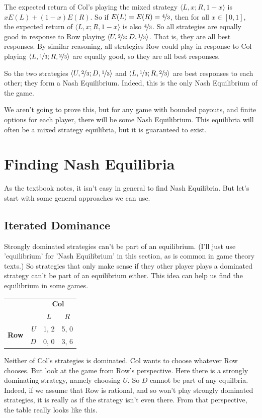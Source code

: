 \documentclass[openany]{book}
\begin{document}
The expected return of Col's playing the mixed strategy $\langle L, x; R, 1-x \rangle$ is $xE(L) + (1-x)E(R)$. So if $E(L) = E(R) = \nicefrac{4}{3}$, then for all $x \in [0, 1]$, the expected return of $\langle L, x; R, 1-x \rangle$ is also $\nicefrac{4}{3}$. So all strategies are equally good in response to Row playing $\langle U, \nicefrac{2}{3}; D, \nicefrac{1}{3} \rangle$. That is, they are all best responses. By similar reasoning, all strategies Row could play in response to Col playing $\langle L, \nicefrac{1}{3}; R, \nicefrac{2}{3} \rangle$ are equally good, so they are all best responses.

So the two strategies $\langle U, \nicefrac{2}{3}; D, \nicefrac{1}{3} \rangle$ and $\langle L, \nicefrac{1}{3}; R, \nicefrac{2}{3} \rangle$ are best responses to each other; they form a Nash Equilibrium. Indeed, this is the only Nash Equilibrium of the game.

We aren't going to prove this, but for any game with bounded payouts, and finite options for each player, there will be some Nash Equilibrium. This equilibria will often be a mixed strategy equilibria, but it is guaranteed to exist.

\section{Finding Nash Equilibria}

As the textbook notes, it isn't easy in general to find Nash Equilibria. But let's start with some general approaches we can use. 

\subsection{Iterated Dominance}

Strongly dominated strategies can't be part of an equilibrium. (I'll just use 'equilibrium' for 'Nash Equilibrium' in this section, as is common in game theory texts.) So strategies that only make sense if they other player plays a dominated strategy can't be part of an equilibrium either. This idea can help us find the equilibrium in some games.

\begin{center}
\begin{tabular}{l r | c c}
& & \multicolumn{2}{c}{\textbf{Col}} \\
& & $L$ & $R$ \\ \hline
\multirow{2}{*}{\textbf{Row}} & $U$ & 1, 2 & 5, 0\\
& $D$ & 0, 0 & 3, 6
\end{tabular}
\end{center}
Neither of Col's strategies is dominated. Col wants to choose whatever Row chooses. But look at the game from Row's perspective. Here there is a strongly dominating strategy, namely choosing $U$. So $D$ cannot be part of any equilbria. Indeed, if we assume that Row is rational, and so won't play strongly dominated strategies, it is really as if the strategy isn't even there. From that perspective, the table really looks like this.
\end{document}
